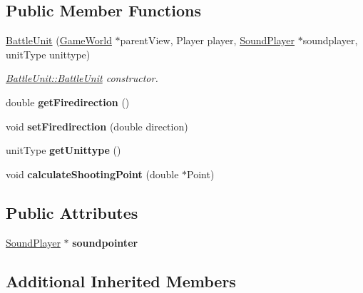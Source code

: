 \subsection*{Public Member Functions}
\begin{DoxyCompactItemize}
\item 
\hyperlink{class_battle_unit_ab89fc2d2730cc059c34bb7cd3473d2f0}{Battle\+Unit} (\hyperlink{class_game_world}{Game\+World} $\ast$parent\+View, Player player, \hyperlink{class_sound_player}{Sound\+Player} $\ast$soundplayer, unit\+Type unittype)
\begin{DoxyCompactList}\small\item\em \hyperlink{class_battle_unit_ab89fc2d2730cc059c34bb7cd3473d2f0}{Battle\+Unit\+::\+Battle\+Unit} constructor. \end{DoxyCompactList}\item 
double {\bfseries get\+Firedirection} ()\hypertarget{class_battle_unit_aa5a7ea370e2f789b51f5617b45822bdb}{}\label{class_battle_unit_aa5a7ea370e2f789b51f5617b45822bdb}

\item 
void {\bfseries set\+Firedirection} (double direction)\hypertarget{class_battle_unit_ab038bbc9e82cea88af5a9228c0559463}{}\label{class_battle_unit_ab038bbc9e82cea88af5a9228c0559463}

\item 
unit\+Type {\bfseries get\+Unittype} ()\hypertarget{class_battle_unit_a26e22880479bf89c7cc3cec7c8f84a0b}{}\label{class_battle_unit_a26e22880479bf89c7cc3cec7c8f84a0b}

\item 
void {\bfseries calculate\+Shooting\+Point} (double $\ast$Point)\hypertarget{class_battle_unit_a065ad7ba4c947aafd266b7a9e4c523a4}{}\label{class_battle_unit_a065ad7ba4c947aafd266b7a9e4c523a4}

\end{DoxyCompactItemize}
\subsection*{Public Attributes}
\begin{DoxyCompactItemize}
\item 
\hyperlink{class_sound_player}{Sound\+Player} $\ast$ {\bfseries soundpointer}\hypertarget{class_battle_unit_ac450e1e80608c8031e27406bc0be5a90}{}\label{class_battle_unit_ac450e1e80608c8031e27406bc0be5a90}

\end{DoxyCompactItemize}
\subsection*{Additional Inherited Members}



